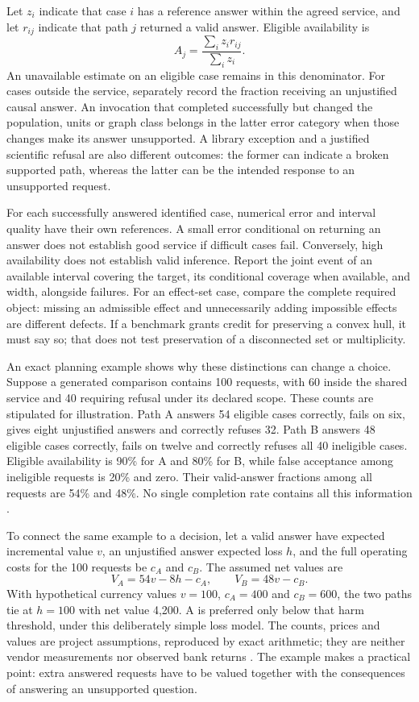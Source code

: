 Let $z_i$ indicate that case $i$ has a reference answer within the agreed
service, and let $r_{ij}$ indicate that path $j$ returned a valid answer.
Eligible availability is
\[
 A_j=\frac{\sum_i z_i r_{ij}}{\sum_i z_i}.
\]
An unavailable estimate on an eligible case remains in this denominator.
For cases outside the service, separately record the fraction receiving an
unjustified causal answer. An invocation that completed successfully but
changed the population, units or graph class belongs in the latter error
category when those changes make its answer unsupported. A library exception
and a justified scientific refusal are also different outcomes: the former
can indicate a broken supported path, whereas the latter can be the intended
response to an unsupported request.

For each successfully answered identified case, numerical error and interval
quality have their own references. A small error conditional on returning
an answer does not establish good service if difficult cases fail. Conversely,
high availability does not establish valid inference. Report the joint event
of an available interval covering the target, its conditional coverage when
available, and width, alongside failures. For an effect-set case, compare
the complete required object: missing an admissible effect and unnecessarily
adding impossible effects are different defects. If a benchmark grants
credit for preserving a convex hull, it must say so; that does not test
preservation of a disconnected set or multiplicity.

An exact planning example shows why these distinctions can change a choice.
Suppose a generated comparison contains 100 requests, with 60 inside the
shared service and 40 requiring refusal under its declared scope. These
counts are stipulated for illustration. Path A answers 54 eligible cases
correctly, fails on six, gives eight unjustified answers and correctly refuses
32. Path B answers 48 eligible cases correctly, fails on twelve and correctly
refuses all 40 ineligible cases. Eligible availability is 90\% for A and
80\% for B, while false acceptance among ineligible requests is 20\% and
zero. Their valid-answer fractions among all requests are 54\% and 48\%.
No single completion rate contains all this information
\citep{exec13_survey_comparison}.

To connect the same example to a decision, let a valid answer have expected
incremental value $v$, an unjustified answer expected loss $h$, and the
full operating costs for the 100 requests be $c_A$ and $c_B$. The assumed
net values are
\[
 V_A=54v-8h-c_A,\qquad V_B=48v-c_B.
\]
With hypothetical currency values $v=100$, $c_A=400$ and $c_B=600$, the
two paths tie at $h=100$ with net value 4,200. A is preferred only below
that harm threshold, under this deliberately simple loss model. The counts,
prices and values are project assumptions, reproduced by exact arithmetic;
they are neither vendor measurements nor observed bank returns
\citep{exec13_survey_comparison}. The example makes a practical point:
extra answered requests have to be valued together with the consequences
of answering an unsupported question.

